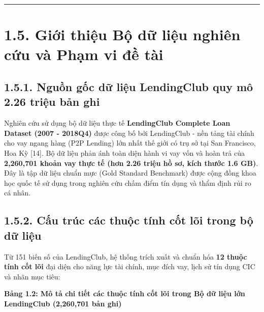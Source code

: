 \documentclass[
  13pt,
  a4paper,
]{report}
\begin{document}
\begin{center}\rule{0.5\linewidth}{0.5pt}\end{center}

\section{1.5. Giới thiệu Bộ dữ liệu nghiên cứu và Phạm vi đề
tài}\label{giux1edbi-thiux1ec7u-bux1ed9-dux1eef-liux1ec7u-nghiuxean-cux1ee9u-vuxe0-phux1ea1m-vi-ux111ux1ec1-tuxe0i}

\subsection{1.5.1. Nguồn gốc dữ liệu LendingClub quy mô 2.26 triệu bản
ghi}\label{nguux1ed3n-gux1ed1c-dux1eef-liux1ec7u-lendingclub-quy-muxf4-2.26-triux1ec7u-bux1ea3n-ghi}

Nghiên cứu sử dụng bộ dữ liệu thực tế \textbf{LendingClub Complete Loan
Dataset (2007 - 2018Q4)} được công bố bởi LendingClub - nền tảng tài
chính cho vay ngang hàng (P2P Lending) lớn nhất thế giới có trụ sở tại
San Francisco, Hoa Kỳ {[}14{]}. Bộ dữ liệu phản ánh toàn diện hành vi
vay vốn và hoàn trả của \textbf{2,260,701 khoản vay thực tế (hơn 2.26
triệu hồ sơ, kích thước 1.6 GB)}. Đây là tập dữ liệu chuẩn mực (Gold
Standard Benchmark) được cộng đồng khoa học quốc tế sử dụng trong nghiên
cứu chấm điểm tín dụng và thẩm định rủi ro cá nhân.

\subsection{1.5.2. Cấu trúc các thuộc tính cốt lõi trong bộ dữ
liệu}\label{cux1ea5u-truxfac-cuxe1c-thuux1ed9c-tuxednh-cux1ed1t-luxf5i-trong-bux1ed9-dux1eef-liux1ec7u}

Từ 151 biến số của LendingClub, hệ thống trích xuất và chuẩn hóa
\textbf{12 thuộc tính cốt lõi} đại diện cho năng lực tài chính, mục đích
vay, lịch sử tín dụng CIC và nhãn mục tiêu:

\textbf{Bảng 1.2: Mô tả chi tiết các thuộc tính cốt lõi trong Bộ dữ liệu
lớn LendingClub (2,260,701 bản ghi)}
\end{document}
